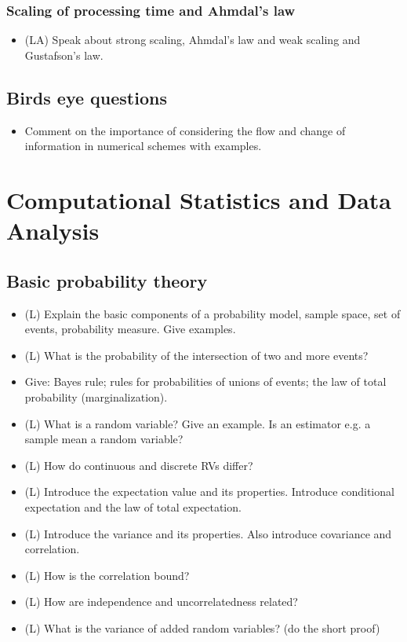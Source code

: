\subsubsection*{Scaling of processing time and Ahmdal's law}
\begin{itemize}
    \item (LA) Speak about strong scaling, Ahmdal's law and weak scaling and Gustafson's law.
\end{itemize}

\subsection*{Birds eye questions}
\begin{itemize}
    \item Comment on the importance of considering the flow and change of information in numerical schemes with examples.
\end{itemize}

\section{Computational Statistics and Data Analysis}

\subsection*{Basic probability theory}

\begin{itemize}
    \item (L) Explain the basic components of a probability model, sample space, set of events, probability measure. Give examples.
    \item (L) What is the probability of the intersection of two and more events?
    \item Give: Bayes rule; rules for probabilities of unions of events; the law of total probability (marginalization).
\end{itemize}

\begin{itemize}
    \item (L) What is a random variable? Give an example. Is an estimator e.g. a sample mean a random variable?
    \item (L) How do continuous and discrete RVs differ?
    \item (L) Introduce the expectation value and its properties. Introduce conditional expectation and the law of total expectation.
    \item (L) Introduce the variance and its properties. Also introduce covariance and correlation.
    \item (L) How is the correlation bound?
    \item (L) How are independence and uncorrelatedness related?
    \item (L) What is the variance of added random variables? (do the short proof)
\end{itemize}

